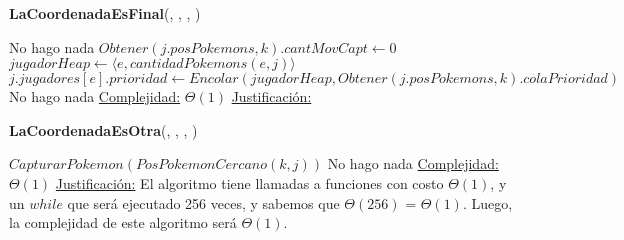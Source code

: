 \begin{algorithm}[H]{\textbf{LaCoordenadaEsFinal}(, , , )}   
    \begin{algorithmic}[1]
                                \State \Comment No hago nada
                            \Else
                                \State $Obtener(j.posPokemons, k).cantMovCapt \gets 0$
                                \State $jugadorHeap \gets \langle e, cantidadPokemons(e,j) \rangle$
                                \State $j.jugadores[e].prioridad \gets Encolar(jugadorHeap, Obtener(j.posPokemons, k).colaPrioridad)$
                            \EndIf
                        \Else
                            \State \Comment No hago nada
                        \EndIf
                    \EndIf
                \EndIf
                \medskip
                \Statex \underline{Complejidad:} $\Theta(1)$
        \Statex \underline{Justificación:}  
    \end{algorithmic}
\end{algorithm} 

\begin{algorithm}[H]{\textbf{LaCoordenadaEsOtra}(, , , )}    
    \begin{algorithmic}[1]
                        \State $CapturarPokemon(PosPokemonCercano(k,j))$
                    \Else
                        \State \Comment No hago nada
                    \EndIf
                \EndIf
        \medskip
        \Statex \underline{Complejidad:} $\Theta(1)$
        \Statex \underline{Justificación:}  El algoritmo tiene llamadas a funciones con costo $\Theta(1)$, y un $while$ que será ejecutado 256 veces, y sabemos que $\Theta (256)$ = $\Theta (1)$. Luego, la complejidad de este algoritmo será $\Theta (1)$.
    \end{algorithmic}
\end{algorithm} 

